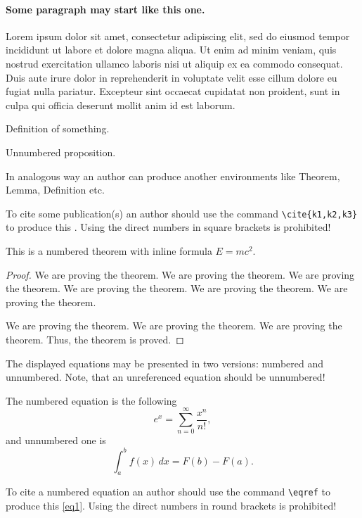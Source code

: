 \documentclass[12pt,twoside,draft]{cmpart}
\begin{document}
\paragraph{Some paragraph may start like this one.}
Lorem ipsum dolor sit amet, consectetur adipiscing elit, sed do eiusmod tempor
incididunt ut labore et dolore magna aliqua. Ut enim ad minim veniam,
quis nostrud exercitation ullamco laboris nisi ut aliquip ex ea commodo consequat.
Duis aute irure dolor in reprehenderit in voluptate velit esse cillum dolore eu fugiat nulla pariatur.
Excepteur sint occaecat cupidatat non proident, sunt in culpa qui officia deserunt mollit anim id est laborum.

\begin{definition}
Definition of something.
\end{definition}

\begin{proposition*}
Unnumbered proposition.
\end{proposition*}

In analogous way an author can produce another environments like
Theorem, Lemma, Definition etc.

To cite some publication(s) an author should use the command 
\verb"\cite{k1,k2,k3}" to produce this \cite{k1,k2,k3}.
Using the direct numbers in square brackets is prohibited!

\begin{theorem}
This is a numbered theorem with inline formula $E=mc^2$.
\end{theorem}
\begin{proof}
We are proving the theorem. We are proving the theorem. We are proving the theorem.
We are proving the theorem. We are proving the theorem. We are proving the theorem.

We are proving the theorem. We are proving the theorem. We are proving the theorem.
Thus, the theorem is proved.
\end{proof}

The displayed equations may be presented in two versions: numbered and unnumbered.
Note, that an unreferenced equation should be unnumbered!

The numbered equation is the following
\begin{equation}\label{eq1}
 e^x=\sum_{n=0}^\infty \frac{x^n}{n!},
\end{equation}
and unnumbered one is
\[
 \int_a^b f(x)\,dx=F(b)-F(a).
\]

To cite a numbered equation an author should use the command \verb"\eqref" to
produce this \eqref{eq1}. Using the direct numbers in round brackets is prohibited!
\end{document}
